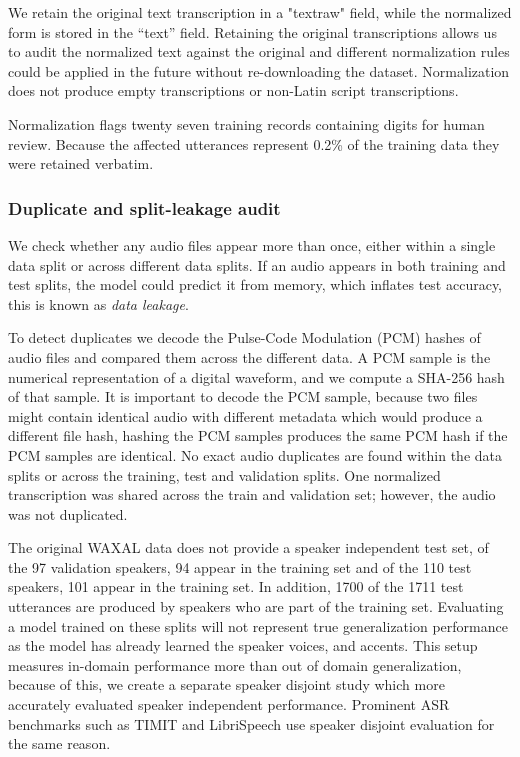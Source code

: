 {We retain the original text transcription in a "textraw" field, while the normalized form is stored in the “text” field. Retaining the original transcriptions allows us to audit the normalized text against the original and different normalization rules could be applied in the future without re-downloading the dataset. Normalization does not produce empty transcriptions or non-Latin script transcriptions.

Normalization flags twenty seven training records containing digits for human review. Because the affected utterances represent 0.2\% of the training data they were retained verbatim.


\subsubsection{Duplicate and split-leakage audit}

We check whether any audio files appear more than once, either within a single data split or across different data splits. If an audio appears in both training and test splits, the model could predict it from memory, which inflates test accuracy, this is known as \emph{data leakage}\citep{Kaufman2012}.

To detect duplicates we decode the Pulse-Code Modulation (PCM) hashes of audio files and compared them across the different data. A PCM sample is the numerical representation of a digital waveform, and we compute a SHA-256 hash of that sample. It is important to decode the PCM sample, because two files might contain identical audio with different metadata which would produce a different file hash, hashing the PCM samples produces the same PCM hash if the PCM samples are identical. No exact audio duplicates are found within the data splits or across the training, test and validation splits. One normalized transcription was shared across the train and validation set; however, the audio was not duplicated.

The original WAXAL data does not provide a speaker independent test set, of the 97 validation speakers, 94 appear in the training set and of the 110 test speakers, 101 appear in the training set. In addition, 1700 of the 1711 test utterances are produced by speakers who are part of the training set. Evaluating a model trained on these splits will not represent true generalization performance as the model has already learned the speaker voices, and accents. This setup measures in-domain performance more than out of domain generalization, because of this, we create a separate speaker disjoint study which more accurately evaluated speaker independent performance. Prominent ASR benchmarks such as TIMIT \citep{Garofolo1993} and LibriSpeech \citep{Panayotov2015} use speaker disjoint evaluation for the same reason.


}
